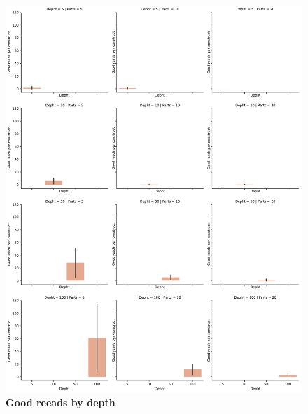 \documentclass[11pt, a4paper]{article}
\begin{document}
\begin{figure}[ht]
    \begin{center}
    \includegraphics[width=1\textwidth]{../results/images_notebook/v_312/good_reads_plot.pdf}
    \end{center}
    \caption{{\bf Good reeads by depth }}
   \label{fig:v_312_good_reads_plot.r}
\end{figure}
\end{document}
